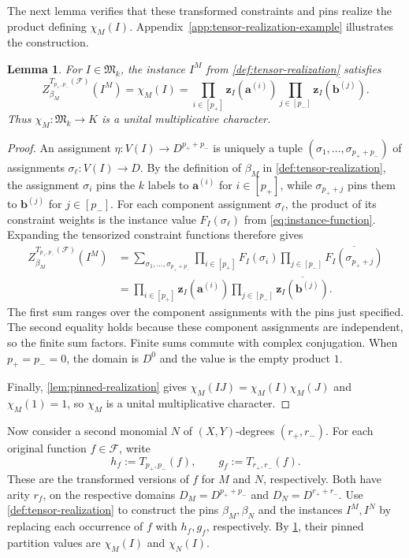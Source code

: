 \documentclass[11pt,letterpaper,onecolumn]{article}
\theoremstyle{plain}
\newtheorem{lemma}[lemma]{Lemma}
\theoremstyle{definition}
\theoremstyle{remark}
\newcommand{\cF}{\mathcal F}
\newcommand{\zvec}[1]{\mathbf z_{#1}}
\newcommand{\InstMonoid}[1]{\mathfrak M_{#1}}
\begin{document}
The next lemma verifies that these transformed constraints and pins
realize the product defining $\chi_M(I)$.
Appendix~\ref{app:tensor-realization-example} illustrates the construction.

\begin{lemma}
\label{lem:tensor-character}
For $I\in\InstMonoid{k}$, the instance $I^M$ from
\cref{def:tensor-realization} satisfies
\begin{equation*}
  Z_{\beta_M}^{T_{p_+,p_-}(\cF)}(I^M)
  =\chi_M(I)
  =\prod_{i\in[p_+]}\zvec I(\mathbf a^{(i)})
    \prod_{j\in[p_-]}\overline{\zvec I(\mathbf b^{(j)})}.
\end{equation*}
Thus $\chi_M:\InstMonoid{k}\to K$ is a unital multiplicative character.
\end{lemma}

\begin{proof}

An assignment $\eta:V(I)\to D^{p_++p_-}$ is uniquely a tuple
$(\sigma_1,\ldots,\sigma_{p_++p_-})$ of assignments
$\sigma_\ell:V(I)\to D$.  By the definition of $\beta_M$ in
\cref{def:tensor-realization}, the assignment
$\sigma_i$ pins the $k$ labels to $\mathbf a^{(i)}$ for $i\in[p_+]$, while
$\sigma_{p_++j}$ pins them to $\mathbf b^{(j)}$ for $j\in[p_-]$.
For each component assignment $\sigma_\ell$, the product of its
constraint weights is the instance value $F_I(\sigma_\ell)$ from
\eqref{eq:instance-function}.  Expanding the tensorized constraint
functions therefore gives
\begin{align*}
  Z_{\beta_M}^{T_{p_+,p_-}(\cF)}(I^M)
  &=\sum_{\sigma_1,\ldots,\sigma_{p_++p_-}}
      \prod_{i\in[p_+]} F_I(\sigma_i)
      \prod_{j\in[p_-]}\overline{F_I(\sigma_{p_++j})}\\
  &=\prod_{i\in[p_+]}\zvec I(\mathbf a^{(i)})
    \prod_{j\in[p_-]}\overline{\zvec I(\mathbf b^{(j)})}.
\end{align*}
The first sum ranges over the component assignments with the pins just
specified.  The second equality holds because these component assignments
are independent, so the finite sum factors. Finite sums commute with complex
conjugation.  When $p_+=p_-=0$, the domain is $D^0$ and the value is the empty
product $1$.

Finally, \cref{lem:pinned-realization} gives
$\chi_M(IJ)=\chi_M(I)\chi_M(J)$ and $\chi_M(1)=1$, so $\chi_M$ is a unital
multiplicative character.
\end{proof}

Now consider a second monomial $N$ of $(X,Y)$-degrees $(r_+,r_-)$.
For each original function $f\in\cF$, write
\[
  h_f:=T_{p_+,p_-}(f),\qquad
  g_f:=T_{r_+,r_-}(f).
\]
These are the transformed versions of $f$ for $M$ and $N$, respectively.
Both have arity $r_f$, on the respective domains
$D_M=D^{p_++p_-}$ and $D_N=D^{r_++r_-}$.
Use \cref{def:tensor-realization} to construct the pins $\beta_M,\beta_N$
and the instances $I^M,I^N$ by replacing each occurrence of $f$ with
$h_f,g_f$, respectively.  By \cref{lem:tensor-character}, their pinned
partition values are $\chi_M(I)$ and $\chi_N(I)$.
\end{document}
